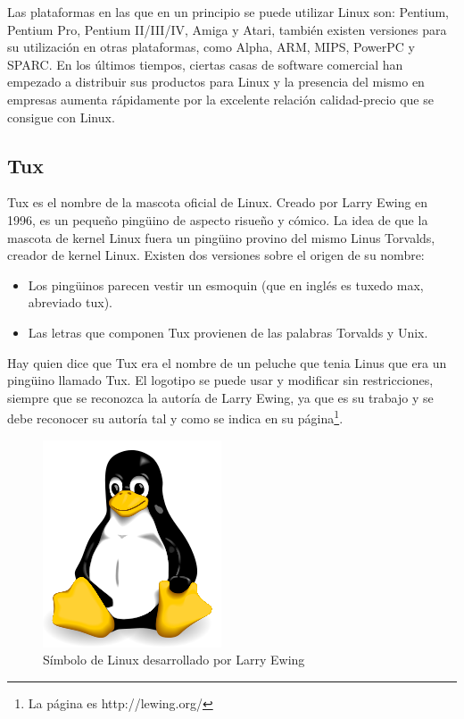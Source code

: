 \documentclass[12pt, twoside]{report}
\begin{document}
Las plataformas en las que en un principio se puede utilizar Linux son: Pentium, Pentium Pro, Pentium II/III/IV, Amiga y Atari, también existen versiones para su utilización en otras plataformas, como Alpha, ARM, MIPS, PowerPC y SPARC.
En los últimos tiempos, ciertas casas de software comercial han empezado a distribuir sus productos para Linux y la presencia del mismo en empresas aumenta rápidamente por la excelente relación calidad-precio que se consigue con Linux.



\subsection{Tux}
Tux es el nombre de la mascota oficial de Linux. Creado por Larry Ewing en 1996, es un pequeño pingüino de aspecto risueño y cómico. La idea de que la mascota de kernel Linux fuera un pingüino provino del mismo Linus Torvalds, creador de kernel Linux.
Existen dos versiones sobre el origen de su nombre:
\begin{itemize}
	\item Los pingüinos parecen vestir un     esmoquin (que en inglés es tuxedo max, abreviado tux).
	\item Las letras que componen Tux provienen de las palabras Torvalds y Unix.
\end{itemize}
  
Hay quien dice que Tux era el nombre de un peluche que tenia Linus que era un pingüino llamado Tux.
El logotipo se puede usar y modificar sin restricciones, siempre que se reconozca la autoría de Larry Ewing, ya que es su trabajo y se debe reconocer su autoría tal y como se indica en su página\footnote{La página es http://lewing.org/}.

\begin{figure}
	\centering
	\includegraphics[width=0.5\linewidth]{200px-Tux.png}
	\caption{Símbolo de Linux desarrollado por Larry Ewing}
	\label{fig1002}
\end{figure}
\end{document}

